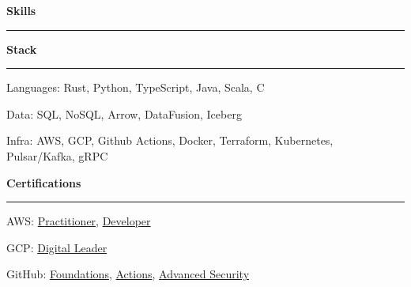 \documentclass[10pt,letterpaper]{article}
\begin{document}
\begin{justify}
      \vspace{0.15cm}
      {\Large \textbf{Skills}\strut}
      \hrule
      \begin{minipage}[t]{8.5cm}
            \textbf{Stack}\strut
            \hrule
            \vspace{0.2cm}
            \begin{itemize}[label={}, leftmargin=0pt]
                  \begin{item}
                        Languages: Rust, Python, TypeScript, Java, Scala, C
                  \end{item}
                  \begin{item}
                        Data: SQL, NoSQL, Arrow, DataFusion, Iceberg
                  \end{item}
                  \begin{item}
                        Infra: AWS, GCP, Github Actions, Docker, Terraform, Kubernetes, Pulsar/Kafka, gRPC
                  \end{item}
            \end{itemize}
      \end{minipage}
      \hfill
      \begin{minipage}[t]{7.5cm}
            \textbf{Certifications}\strut
            \hrule
            \vspace{0.2cm}
            \begin{itemize}[label={}, leftmargin=0pt]
                  \begin{item}
                        AWS:
                        \href{https://www.credly.com/badges/33614ca6-2f0d-456b-87e9-bf8b8591cbf8/public_url}{Practitioner},
                        \href{https://www.credly.com/badges/e9b6c64c-2175-4345-950b-6331fd88af43/public_url}{Developer}
                  \end{item}
                  \begin{item}
                        GCP:
                        \href{https://www.credly.com/badges/0f158c45-adb0-4ac9-9d5f-0039649e4808/public_url}{Digital Leader}
                  \end{item}
                  \begin{item}
                        GitHub:
                        \href{https://www.credly.com/badges/0f59d53a-1ecb-4f6f-8a84-96fa3cb55965/public_url}{Foundations},
                        \href{https://www.credly.com/badges/6da40853-2bc6-4738-887e-8710a10e7a29/public_url}{Actions},
                        \href{https://www.credly.com/badges/b3c3ae21-61a9-4519-85d6-29a3bb8c443a/public_url}{Advanced Security}

\end{item}
\end{itemize}
\end{minipage}
\end{justify}
\end{document}

